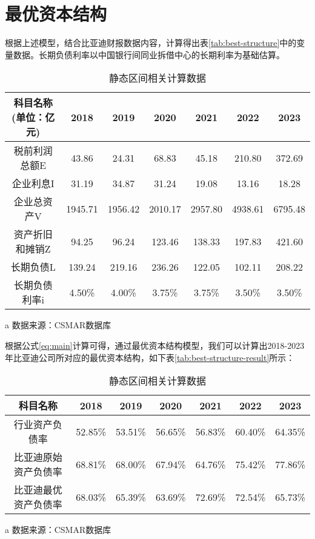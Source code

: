 \section{最优资本结构}
根据上述模型，结合比亚迪财报数据内容，计算得出表\eqref{tab:best-structure}中的变量数据。长期负债利率以中国银行间同业拆借中心的长期利率为基础估算。 
\begin{table}
  \centering
  \begin{threeparttable}[c]
    \caption{静态区间相关计算数据}
    \label{tab:best-structure}
    \begin{tabular}{ccccccc}
      \toprule
        科目名称(单位：亿元) & 2018 & 2019 & 2020 & 2021 & 2022 & 2023 \\ 
      \midrule
        税前利润总额E & 43.86  & 24.31  & 68.83  & 45.18  & 210.80  & 372.69  \\ 
        企业利息I & 31.19  & 34.87  & 31.24  & 19.08  & 13.16  & 18.28  \\ 
        企业总资产V & 1945.71  & 1956.42  & 2010.17  & 2957.80  & 4938.61  & 6795.48  \\ 
        资产折旧和摊销Z & 94.25  & 96.24  & 123.46  & 138.33  & 197.83  & 421.60  \\ 
        长期负债L & 139.24  & 219.16  & 236.26  & 122.05  & 102.11  & 208.22  \\ 
        长期负债利率i & 4.50\% & 4.00\% & 3.75\% & 3.75\% & 3.50\% & 3.50\% \\ 
      \bottomrule
    \end{tabular}
    \begin{tablenotes}
      \item [a] 数据来源：CSMAR数据库
    \end{tablenotes}
  \end{threeparttable}
\end{table}
根据公式\eqref{eq:main}计算可得，通过最优资本结构模型，我们可以计算出2018-2023年比亚迪公司所对应的最优资本结构，如下表\eqref{tab:best-structure-result}所示：
\begin{table}
  \centering
  \begin{threeparttable}[c]
    \caption{静态区间相关计算数据}
    \label{tab:best-structure-result}
    \begin{tabular}{ccccccc}
      \toprule
        科目名称 & 2018 & 2019 & 2020 & 2021 & 2022 & 2023 \\ 
      \midrule
        行业资产负债率 & 52.85\% & 53.51\% & 56.65\% & 56.83\% & 60.40\% & 64.35\% \\ 
        比亚迪原始资产负债率 & 68.81\% & 68.00\% & 67.94\% & 64.76\% & 75.42\% & 77.86\% \\ 
        比亚迪最优资产负债率 & 68.03\% & 65.39\% & 63.69\% & 72.69\% & 72.54\% & 65.73\% \\ 
      \bottomrule
    \end{tabular}
    \begin{tablenotes}
      \item [a] 数据来源：CSMAR数据库
    \end{tablenotes}
  \end{threeparttable}
\end{table}

